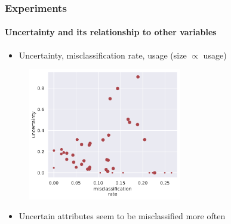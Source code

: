 \documentclass[9pt]{beamer}
\begin{document}
\begin{frame}	
\frametitle{Experiments}
\framesubtitle{Uncertainty and its relationship to other variables}
\begin{itemize}
	\item Uncertainty, misclassification rate, usage (size $\propto$ usage)
\end{itemize}
	\begin{figure}
		\centering
		\includegraphics[width=0.6\textwidth]{images/error_sigma_corr_all.pdf} 
	\end{figure}
	\begin{itemize}
		\item Uncertain attributes seem to be misclassified more often
	\end{itemize}
\end{frame} 
\end{document}

